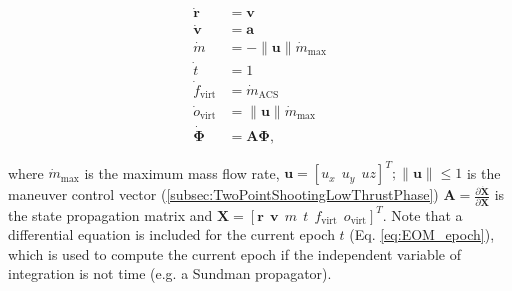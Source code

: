 \begin{align}
\dot{\mathbf{r}} &= \mathbf{v} \label{eq:EOM_v}\\
\dot{\mathbf{v}} &= \mathbf{a} \label{eq:EOM_a} \\
\dot{m} &= -\|\mathbf{u}\|\dot{m}_{\text{max}} \label{eq:EOM_m} \\
\dot{t} &= 1 \label{eq:EOM_epoch} \\
\dot{f}_{\text{virt}} &= \dot{m}_{\text{ACS}} \label{eq:EOM_fuel} \\
\dot{o}_{\text{virt}} &= \|\mathbf{u}\|\dot{m}_{\text{max}} \label{eq:EOM_oxidizer} \\
\dot{\mathbf{\Phi}} &= \mathbf{A} \mathbf{\Phi} \label{eq:variational_eq},
\end{align}

\noindent where $\dot{m}_{\text{max}}$ is the maximum mass flow rate, $\mathbf{u} = \left[ u_x~~u_y~~uz \right]^T; \|\mathbf{u}\| \le 1$ is the maneuver control vector (\ref{subsec:TwoPointShootingLowThrustPhase}) $\mathbf{A} = \frac{\partial \dot{\mathbf{X}}}{\partial \mathbf{X}}$ is the state propagation matrix and $\mathbf{X} = \left[\mathbf{r} ~~ \mathbf{v} ~~ m ~~ t ~~ f_{\text{virt}} ~~ o_{\text{virt}} \right]^T$. Note that a differential equation is included for the current epoch $t$ (Eq. \ref{eq:EOM_epoch}), which is used to compute the current epoch if the independent variable of integration is not time (e.g. a Sundman propagator).

